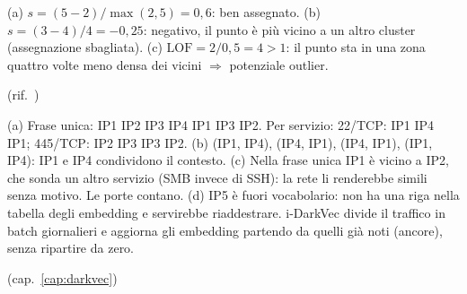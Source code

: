 \begin{soluzione}
(a) $s = (5-2)/\max(2,5) = 0{,}6$: ben assegnato.
(b) $s = (3-4)/4 = -0{,}25$: negativo, il punto è più vicino a un altro cluster (assegnazione sbagliata).
(c) $\mathrm{LOF} = 2/0{,}5 = 4 > 1$: il punto sta in una zona quattro volte meno densa dei vicini $\Rightarrow$ potenziale outlier.

(rif.\ )
\end{soluzione}

\begin{soluzione}
(a) Frase unica: IP1 IP2 IP3 IP4 IP1 IP3 IP2. Per servizio: 22/TCP: IP1 IP4 IP1; 445/TCP: IP2 IP3 IP3 IP2.
(b) (IP1, IP4), (IP4, IP1), (IP4, IP1), (IP1, IP4): IP1 e IP4 condividono il contesto.
(c) Nella frase unica IP1 è vicino a IP2, che sonda un altro servizio (SMB invece di SSH): la rete li renderebbe simili senza motivo.
Le porte contano.
(d) IP5 è fuori vocabolario: non ha una riga nella tabella degli embedding e servirebbe riaddestrare. i-DarkVec divide il traffico in
batch giornalieri e aggiorna gli embedding partendo da quelli già noti (ancore), senza ripartire da zero.

(cap.~\ref{cap:darkvec})
\end{soluzione}
